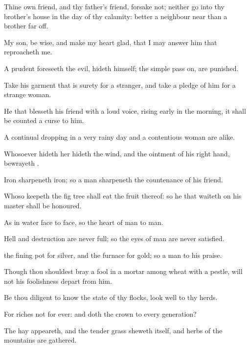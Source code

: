{Thine own
friend, and thy
father’s
friend,
forsake not; neither
go into thy
brother’s
house in the
day of thy
calamity:
{}
better
{} a
neighbour
{}
near than a
brother far
off.

My
son, be
wise, and make my
heart
glad, that I may
answer him that
reproacheth me.

A
prudent
{}
foreseeth the
evil,
{}
hideth himself;
{} the
simple pass
on,
{} are
punished.

Take his
garment that is
surety for a
stranger, and take a
pledge of him for a strange
woman.

He that
blesseth his
friend with a
loud
voice, rising
early in the
morning, it shall be
counted a
curse to him.


\par }{\PP {}A
continual
dropping in a very
rainy
day and a
contentious
woman are
alike.

Whosoever
hideth her
hideth the
wind, and the
ointment of his right
hand,
{}
bewrayeth
{}.

Iron
sharpeneth
iron; so a
man
sharpeneth the
countenance of his
friend.

Whoso
keepeth the fig
tree shall
eat the
fruit thereof: so he that
waiteth on his
master shall be
honoured.

As in
water
face
{} to
face, so the
heart of
man to
man.

Hell and
destruction are
never
full; so the
eyes of
man are never
satisfied.

 the fining
pot for
silver, and the
furnace for
gold; so
{} a
man
to his
praise.

Though thou shouldest
bray a
fool in a
mortar
among
wheat with a
pestle,
{} will not his
foolishness
depart from him.


\par }{\PP {}Be thou
diligent to
know the
state of thy
flocks,
{}
look
well to thy
herds.

For
riches
{} not for
ever: and doth the
crown
{} to
every
generation?

The
hay
appeareth, and the tender
grass
sheweth itself, and
herbs of the
mountains are
gathered.

}
